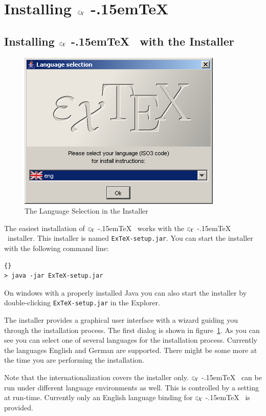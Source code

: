 \documentclass[12pt,div12,a4paper]{scrbook}
\providecommand*{\ExTeX}{\ifx\texorpdfstring\undefined
  \textrm{%
    \ensuremath{\textstyle\varepsilon_{\kern-0.15em\mathcal{X}}}%
    \kern-.15em\TeX}%
  \else\texorpdfstring{%
  \textrm{%
    \ensuremath{\textstyle\varepsilon_{\kern-0.15em\mathcal{X}}}%
    \kern-.15em\TeX
  }}{ExTeX}%
  \fi
}
\begin{document}
\section{Installing \ExTeX}

\subsection{Installing \ExTeX\ with the Installer}\label{sec:installer}

\begin{figure}[tp]
  \centering
  \includegraphics[width=.8\textwidth]{inst1.png}
  \caption{The Language Selection in the Installer}
  \label{fig:inst1}
\end{figure}
The easiest installation of \ExTeX\ works with the \ExTeX\ installer.
This installer is named \texttt{ExTeX-setup.jar}. You can start the
installer with the following command line:

\begin{lstlisting}{}
> java -jar ExTeX-setup.jar
\end{lstlisting}

On windows with a properly installed Java you can also start the
installer by double-clicking \texttt{ExTeX-setup.jar} in the Explorer.

The installer provides a graphical user interface with a wizard
guiding you through the installation process. The first dialog is
shown in figure~\ref{fig:inst1}. As you can see you can select one of
several languages for the installation process. Currently the
languages English and German are supported. There might be some more
at the time you are performing the installation.

Note that the internationalization covers the installer only. \ExTeX\
can be run under different language environments as well. This is
controlled by a setting at run-time. Currently only an English
language binding for \ExTeX\ is provided.
\end{document}
